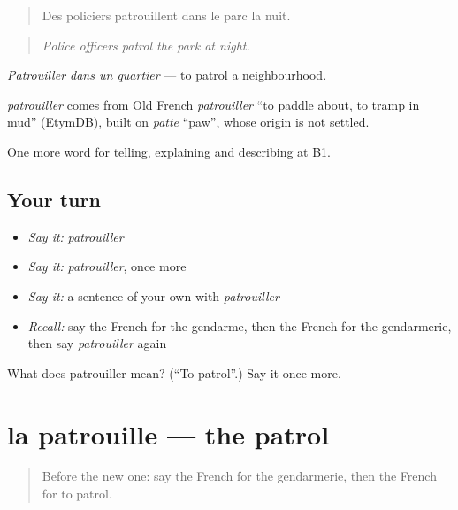 \begin{quote}
Des policiers patrouillent dans le parc la nuit.
\end{quote}

\begin{quote}
\emph{Police officers patrol the park at night.}
\end{quote}

\emph{Patrouiller dans un quartier} — to patrol a neighbourhood.

\begin{cousinweb}
\emph{patrouiller} comes from Old French \emph{patrouiller} \textquotedblleft{}to paddle about, to tramp in mud\textquotedblright{} (EtymDB), built on \emph{patte} \textquotedblleft{}paw\textquotedblright{}, whose origin is not settled.
\end{cousinweb}

\begin{grammarlens}[title={What you've built}]
One more word for telling, explaining and describing at B1.
\end{grammarlens}

\subsection*{Your turn}
\begin{itemize}
\raggedright
  \item \emph{Say it:} \emph{patrouiller}
  \item \emph{Say it:} \emph{patrouiller}, once more
  \item \emph{Say it:} a sentence of your own with \emph{patrouiller}
  \item \emph{Recall:} say the French for the gendarme, then the French for the gendarmerie, then say \emph{patrouiller} again
\end{itemize}

\begin{tcolorbox}[breakable,colback=teal!4,colframe=teal!35!black,title={Before you move on}]
What does patrouiller mean? (\textquotedblleft{}To patrol\textquotedblright{}.) Say it once more.
\end{tcolorbox}
\section[la patrouille]{la patrouille — the patrol}

\label{lesson:FR-C291-patrouille}



\begin{quote}
Before the new one: say the French for the gendarmerie, then the French for to patrol.
\end{quote}

